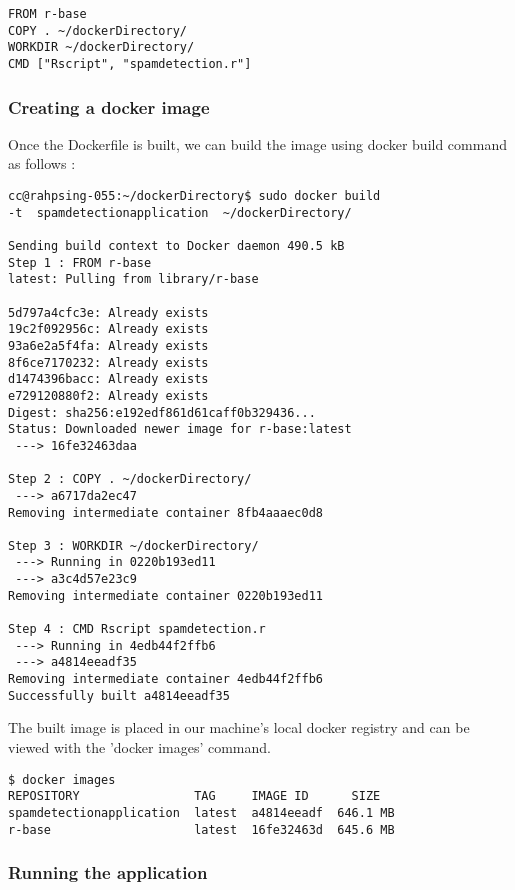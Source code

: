 \documentclass[9pt,twocolumn,twoside]{../../styles/osajnl}
\begin{document}
\begin{verbatim}
FROM r-base
COPY . ~/dockerDirectory/
WORKDIR ~/dockerDirectory/
CMD ["Rscript", "spamdetection.r"]
\end{verbatim}



\subsubsection{Creating a docker image}

Once the Dockerfile is built, we can build the image using docker
build command as follows :

\begin{verbatim}
cc@rahpsing-055:~/dockerDirectory$ sudo docker build 
-t  spamdetectionapplication  ~/dockerDirectory/

Sending build context to Docker daemon 490.5 kB
Step 1 : FROM r-base
latest: Pulling from library/r-base

5d797a4cfc3e: Already exists 
19c2f092956c: Already exists 
93a6e2a5f4fa: Already exists 
8f6ce7170232: Already exists 
d1474396bacc: Already exists 
e729120880f2: Already exists 
Digest: sha256:e192edf861d61caff0b329436...
Status: Downloaded newer image for r-base:latest
 ---> 16fe32463daa

Step 2 : COPY . ~/dockerDirectory/
 ---> a6717da2ec47
Removing intermediate container 8fb4aaaec0d8

Step 3 : WORKDIR ~/dockerDirectory/
 ---> Running in 0220b193ed11
 ---> a3c4d57e23c9
Removing intermediate container 0220b193ed11

Step 4 : CMD Rscript spamdetection.r
 ---> Running in 4edb44f2ffb6
 ---> a4814eeadf35
Removing intermediate container 4edb44f2ffb6
Successfully built a4814eeadf35
\end{verbatim}



The built image is placed in our machine's local docker registry and
can be viewed with the 'docker images' command.

\begin{verbatim}
$ docker images
REPOSITORY                TAG     IMAGE ID      SIZE
spamdetectionapplication  latest  a4814eeadf  646.1 MB
r-base                    latest  16fe32463d  645.6 MB
\end{verbatim}                   


\subsubsection{Running the application}
\end{document}
